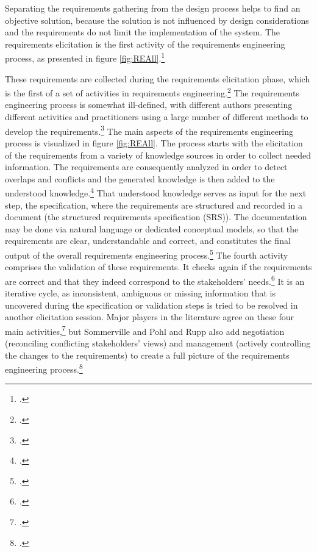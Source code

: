 Separating the requirements gathering from the design process helps to find an objective solution, because the solution is not influenced by design considerations and the requirements do not limit the implementation of the system. The requirements elicitation is the first activity of the requirements engineering process, as presented in figure \ref{fig:REAll}.\footcites[Cf.][p.116]{SommervilleSoftwareengineering2011}[cf.][pp.17]{SommervilleIntegratedrequirementsengineering2005} 

These requirements are collected during the requirements elicitation phase, which is the first of a set of activities in requirements engineering.\footcites[Cf.][p.116]{SommervilleSoftwareengineering2011}[cf.][p.17]{SommervilleIntegratedrequirementsengineering2005} The requirements engineering process is somewhat ill-defined, with different authors presenting different activities and practitioners using a large number of different methods to develop the requirements.\footcite[Cf.][p.225]{ZhangEffectiverequirementsdevelopmentA2007} The main aspects of the requirements engineering process is visualized in figure \ref{fig:REAll}. The process starts with the elicitation of the requirements from a variety of knowledge sources in order to collect needed information. The requirements are consequently analyzed in order to detect overlaps and conflicts and the generated knowledge is then added to the understood knowledge.\footcite[Cf.][p.17]{SommervilleIntegratedrequirementsengineering2005} That understood knowledge serves as input for the next step, the specification, where the requirements are structured and recorded in a document (the structured requirements specification (SRS)). The documentation may be done via natural language or dedicated conceptual models, so that the requirements are clear, understandable and correct, and constitutes the final output of the overall requirements engineering process.\footcites[Cf.][p.17]{SommervilleIntegratedrequirementsengineering2005}[chapter 1]{PohlRequirementsengineeringfundamentals2011} The fourth activity comprises the validation of these requirements. It checks again if the requirements are correct and that they indeed correspond to the stakeholders' needs.\footcite[Cf.][p.17]{SommervilleIntegratedrequirementsengineering2005}
It is an iterative cycle, as inconsistent, ambiguous or missing information that is uncovered during the specification or validation steps is tried to be resolved in another elicitation session. 
Major players in the literature agree on these four main activities,\footcites[Cf.][p.225]{ZhangEffectiverequirementsdevelopmentA2007}[cf.][p.220]{DavisSoftwarerequirementsobjects1993}[cf.][chapter 1]{PohlRequirementsengineeringfundamentals2011}[cf.][p.116]{SommervilleSoftwareengineering2011} but Sommerville and Pohl and Rupp also add negotiation (reconciling conflicting stakeholders' views) and management (actively controlling the changes to the requirements) to create a full picture of the requirements engineering process.\footcites[Cf.][p.17]{SommervilleSoftwareengineering2011}[cf.][chapter 1]{PohlRequirementsengineeringfundamentals2011}

